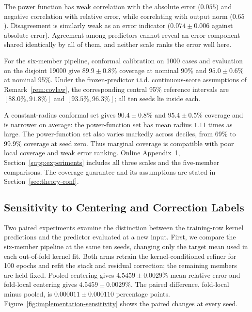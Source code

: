 \documentclass[twoside,11pt]{article}
\newcommand{\uqPlamSix}{89.9}        %
\newcommand{\uqPlamSixSd}{0.8}
\newcommand{\uqPlamSixHi}{95.0}      %
\newcommand{\uqPlamSixHiSd}{0.6}
\newcommand{\uqRawSix}{90.4}         %
\newcommand{\uqRawSixSd}{0.8}
\newcommand{\uqRawSixHi}{95.4}
\newcommand{\uqRawSixHiSd}{0.5}
\newcommand{\uqWidthRatio}{1.11}     %
\newcommand{\uqCorrAbs}{0.055}        %
\newcommand{\uqCorrNorm}{0.65}       %
\newcommand{\uqDisAbs}{0.074}        %
\newcommand{\sensPooled}{4.5459}
\newcommand{\sensPooledSd}{0.0029}
\newcommand{\sensLocal}{4.5459}
\newcommand{\sensLocalSd}{0.0029}
\newcommand{\sensCenterDelta}{0.000011}
\newcommand{\sensCenterDeltaSd}{0.000110}
\begin{document}
The power function has weak correlation with the absolute error ($\uqCorrAbs$) and negative correlation with relative error, while correlating with output norm ($\uqCorrNorm$). Disagreement is similarly weak as an error indicator ($\uqDisAbs\pm0.006$ against absolute error). Agreement among predictors cannot reveal an error component shared identically by all of them, and neither scale ranks the error well here.

For the six-member pipeline, conformal calibration on 1000 cases and evaluation on the disjoint 19000 give $\uqPlamSix\pm\uqPlamSixSd\%$ coverage at nominal 90\% and $\uqPlamSixHi\pm\uqPlamSixHiSd\%$ at nominal 95\%. Under the frozen-predictor i.i.d. continuous-score assumptions of Remark~\ref{rem:covlaw}, the corresponding central 95\% reference intervals are $[88.0\%,91.8\%]$ and $[93.5\%,96.3\%]$; all ten seeds lie inside each.

A constant-radius conformal set gives $\uqRawSix\pm\uqRawSixSd\%$ and $\uqRawSixHi\pm\uqRawSixHiSd\%$ coverage and is narrower on average: the power-function set has mean radius $\uqWidthRatio$ times as large. The power-function set also varies markedly across deciles, from 69\% to 99.9\% coverage at seed zero. Thus marginal coverage is compatible with poor local coverage and weak error ranking. Online Appendix~1, Section~\ref{supp:experiments} includes all three scales and the five-member comparisons. The coverage guarantee and its assumptions are stated in Section~\ref{sec:theory-conf}.

\subsection{Sensitivity to Centering and Correction Labels}
\label{sec:implementation-sensitivity}
Two paired experiments examine the distinction between the training-row
kernel predictions and the predictor evaluated at a new input. First, we
compare the six-member pipeline at the same ten seeds, changing only the
target mean used in each out-of-fold kernel fit. Both arms retrain the
kernel-conditioned refiner for 100 epochs and refit the stack and residual
correction; the remaining members are held fixed. Pooled centering gives
$\sensPooled\pm\sensPooledSd\%$ mean relative error and fold-local
centering gives $\sensLocal\pm\sensLocalSd\%$. The paired difference,
fold-local minus pooled, is $\sensCenterDelta\pm\sensCenterDeltaSd$
percentage points. Figure~\ref{fig:implementation-sensitivity} shows the
paired changes at every seed.
\end{document}
